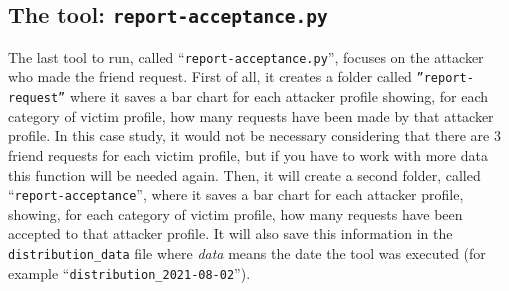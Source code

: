 \subsection{The tool: \texttt{report-acceptance.py}}
\label{cap:tool-report-acc}
The last tool to run, called ``\texttt{report-acceptance.py}'', focuses on the attacker who made the friend request. First of all, it creates a folder called \texttt{''report-request''} where it saves a bar chart for each attacker profile showing, for each category of victim profile, how many requests have been made by that attacker profile. In this case study, it would not be necessary considering that there are 3 friend requests for each victim profile, but if you have to work with more data this function will be needed again. Then, it will create a second folder, called ``\texttt{report-acceptance}'', where it saves a bar chart for each attacker profile, showing, for each category of victim profile, how many requests have been accepted to that attacker profile. It will also save this information in the \texttt{distribution\_data} file where \emph{data} means the date the tool was executed (for example ``\texttt{distribution\_2021-08-02}'').
